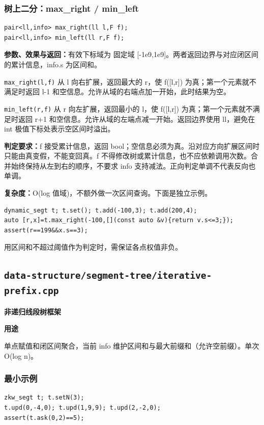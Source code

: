 \documentclass[UTF8,a4paper,10pt]{ctexart}
\newcommand{\TemplUsage}[1]{\textbf{用途}\par #1\par}
\begin{document}
\noindent\begin{minipage}{\textwidth}
\subsubsection*{树上二分：max\_right / min\_left}
\begin{lstlisting}
pair<ll,info> max_right(ll l,F f);
pair<ll,info> min_left(ll r,F f);
\end{lstlisting}
\textbf{参数、效果与返回：}有效下标域为 固定域 [-1e9,1e9]。两者返回边界与对应闭区间的累计信息，info.s 为区间和。

\texttt{max\_right(l,f)} 从 l 向右扩展，返回最大的 r，使 f([l,r]) 为真；第一个元素就不满足时返回 l-1 和空信息。允许从域的右端点加一开始，此时结果为空。

\texttt{min\_left(r,f)} 从 r 向左扩展，返回最小的 l，使 f([l,r]) 为真；第一个元素就不满足时返回 r+1 和空信息。允许从域的左端点减一开始。返回边界使用 ll，避免在 int 极值下标处表示空区间时溢出。

\textbf{判定要求：}f 接受累计信息，返回 bool；空信息必须为真。沿对应方向扩展区间时只能由真变假，不能变回真。f 不得修改树或累计信息，也不应依赖调用次数。合并始终保持从左到右的顺序，不要求 info 支持减法。正向判定单调不代表反向也单调。

\textbf{复杂度：}O(log 值域)，不额外做一次区间查询。下面是独立示例。
\begin{lstlisting}
dynamic_segt t; t.set(); t.add(-100,3); t.add(200,4);
auto [r,x]=t.max_right(-100,[](const auto &v){return v.s<=3;});
assert(r==199&&x.s==3);
\end{lstlisting}
用区间和不超过阈值作为判定时，需保证各点权值非负。
\end{minipage}\par
\clearpage
\subsection{\texttt{data-structure/segment-tree/iterative-prefix.cpp}}
\textbf{非递归线段树框架}\par
\TemplUsage{单点赋值和闭区间聚合，当前 info 维护区间和与最大前缀和（允许空前缀）。单次 O(log n)。}
\subsubsection*{最小示例}
\begin{lstlisting}
zkw_segt t; t.setN(3);
t.upd(0,-4,0); t.upd(1,9,9); t.upd(2,-2,0);
assert(t.ask(0,2)==5);
\end{lstlisting}
\end{document}
